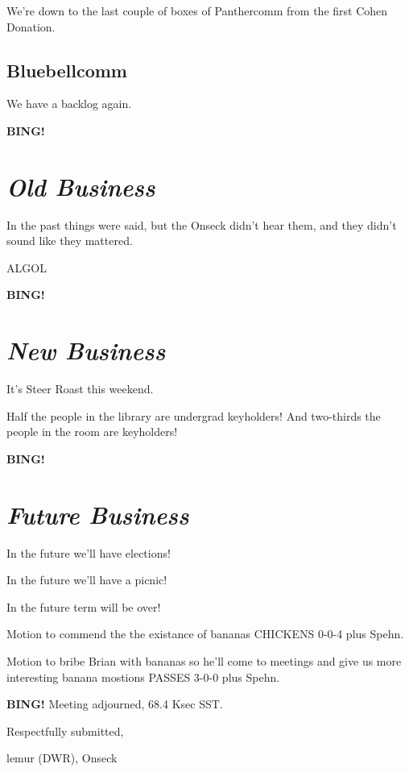 \documentclass[10pt]{article}
\newcommand{\bing}{{\bf BING!} }
\newcommand{\goto}[1]{\bing \vskip 12pt \section*{{\em{#1}}}}
\newcommand{\ps}{ plus Spehn\xspace}
\newcommand{\onseck}{lemur (DWR), Onseck}
\begin{document}
We're down to the last couple of boxes of Panthercomm from the first Cohen Donation.

\subsection*{Bluebellcomm}

We have a backlog again.


\goto{Old Business}

In the past things were said, but the Onseck didn't hear them, and they
didn't sound like they mattered.

ALGOL


\goto{New Business}

It's Steer Roast this weekend.

Half the people in the library are undergrad keyholders!  And two-thirds
the people in the room are keyholders!


\goto{Future Business}

In the future we'll have elections!

In the future we'll have a picnic!

In the future term will be over!

Motion to commend the the existance of bananas CHICKENS 0-0-4\ps.

Motion to bribe Brian with bananas so he'll come to meetings
and give us more interesting banana mostions PASSES 3-0-0\ps.

\bing
\noindent
Meeting adjourned, 68.4 Ksec SST.

\vspace{18pt}

\centerline{Respectfully submitted,}
\centerline{\onseck}
\end{document}
